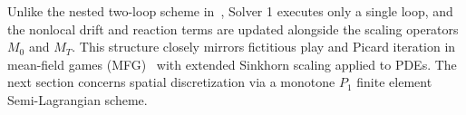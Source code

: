 \documentclass[10pt,a4paper]{article}
\begin{document}
Unlike the nested two-loop scheme in~\cite{Eichinger2026SinkhornConvergence, eldesoukey2026second, eldesoukey2026schrodingerbridgeskineticswarming}, Solver 1 executes only a single loop, and the nonlocal drift and reaction terms are updated alongside the scaling operators $M_0$ and $M_T$. This structure closely mirrors fictitious play and Picard iteration in mean-field games (MFG)~\cite{Inoue2023FictitiousPlay} with extended Sinkhorn scaling applied to PDEs. The next section concerns spatial discretization via a monotone $P_1$ finite element Semi-Lagrangian scheme.
\begin{algorithm}[ht]
\DontPrintSemicolon
{}
\caption{Solver 1: Fixed-Point Iteration}
\end{algorithm}
\end{document}
